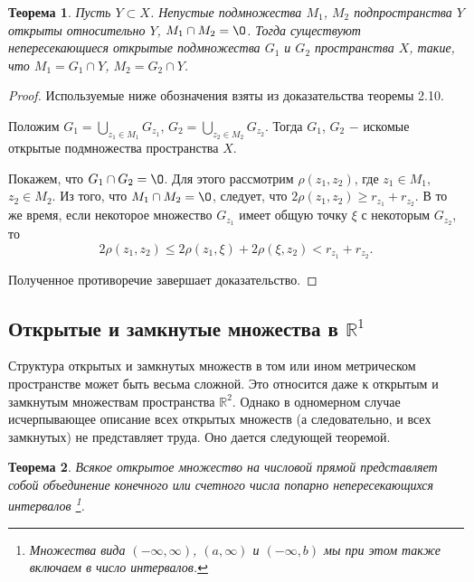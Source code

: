 \documentclass{article}
\newtheorem{theorem}{Теорема}[section]
\begin{document}
\begin{theorem}
Пусть \(Y \subset X\). Непустые подмножества \(M_1\), \(M_2\) подпространства \(Y\) открыты относительно \(Y\), \(M_1 \cap M_2 = \O\). Тогда существуют непересекающиеся открытые подмножества \(G_1\) и \(G_2\) пространства \(X\), такие, что \(M_1 = G_1 \cap Y\), \(M_2 = G_2 \cap Y\).
\end{theorem}

\begin{proof}
Используемые ниже обозначения взяты из доказательства теоремы 2.10.

Положим \(G_1 = \bigcup\limits_{z_1 \in M_1} G_{z_1}\), \(G_2 = \bigcup\limits_{z_2 \in M_2} G_{z_2}\). Тогда \(G_1\), \(G_2\) \(-\) искомые открытые подмножества пространства \(X\).

Покажем, что \(G_1 \cap G_2 = \O\). Для этого рассмотрим \(\rho(z_1, z_2)\), где \(z_1 \in M_1\), \(z_2 \in M_2\). Из того, что \(M_1 \cap M_2 = \O\), следует, что \(2\rho(z_1, z_2) \geq r_{z_1} + r_{z_2}\). В то же время, если некоторое множество \(G_{z_1}\) имеет общую точку \(\xi\) с некоторым \(G_{z_2}\), то
\[
2\rho(z_1, z_2) \leq 2\rho(z_1, \xi) + 2\rho(\xi, z_2) < r_{z_1} + r_{z_2}.
\]

Полученное противоречие завершает доказательство.
\end{proof}

\subsection{Открытые и замкнутые множества в \(\mathbb{R}^1\)}

Структура открытых и замкнутых множеств в том или ином метрическом пространстве может быть весьма сложной. Это относится даже к открытым и замкнутым множествам пространства \(\mathbb{R}^2\). Однако в одномерном случае исчерпывающее описание всех открытых множеств (а следовательно, и всех замкнутых) не представляет труда. Оно дается следующей теоремой.

\begin{theorem}
Всякое открытое множество на числовой прямой представляет собой объединение конечного или счетного числа попарно непересекающихся интервалов
\footnote[1]
{
Множества вида \((- \infty, \infty)\), \((a, \infty)\) и \((- \infty, b)\) мы при этом также включаем в число интервалов.
}.
\end{theorem}
\end{document}
